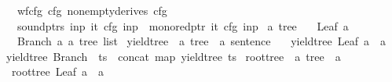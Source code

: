 \begin{isabellebody}
\ \ \ {\isachardoublequoteopen}wf{\isacharunderscore}{\kern0pt}cfg\ cfg{\isachardoublequoteclose}\ {\isachardoublequoteopen}nonempty{\isacharunderscore}{\kern0pt}derives\ cfg{\isachardoublequoteclose}\isanewline
\ \ \ {\isachardoublequoteopen}sound{\isacharunderscore}{\kern0pt}ptrs\ inp\ {\isacharparenleft}{\kern0pt}{\isasymII}{\isacharunderscore}{\kern0pt}it\ cfg\ inp{\isacharparenright}{\kern0pt}\ {\isasymand}\ mono{\isacharunderscore}{\kern0pt}red{\isacharunderscore}{\kern0pt}ptr\ {\isacharparenleft}{\kern0pt}{\isasymII}{\isacharunderscore}{\kern0pt}it\ cfg\ inp{\isacharparenright}{\kern0pt}{\isachardoublequoteclose}%
\isadelimproof
%
\endisadelimproof
%
\isatagproof
%
\endisatagproof
{\isafoldproof}%
%
\isadelimproof
%
\endisadelimproof
%
\isadelimdocument
%
\endisadelimdocument
%
\isatagdocument
%
\isamarkuptrue%
%
\endisatagdocument
{\isafolddocument}%
%
\isadelimdocument
%
\endisadelimdocument
{}\isamarkupfalse%
\ {\isacharprime}{\kern0pt}a\ tree\ {\isacharequal}{\kern0pt}\isanewline
\ \ Leaf\ {\isacharprime}{\kern0pt}a\isanewline
\ \ {\isacharbar}{\kern0pt}\ Branch\ {\isacharprime}{\kern0pt}a\ {\isachardoublequoteopen}{\isacharprime}{\kern0pt}a\ tree\ list{\isachardoublequoteclose}\isanewline
\isanewline
{}\isamarkupfalse%
\ yield{\isacharunderscore}{\kern0pt}tree\ {\isacharcolon}{\kern0pt}{\isacharcolon}{\kern0pt}\ {\isachardoublequoteopen}{\isacharprime}{\kern0pt}a\ tree\ {\isasymRightarrow}\ {\isacharprime}{\kern0pt}a\ sentence{\isachardoublequoteclose}\ \isanewline
\ \ {\isachardoublequoteopen}yield{\isacharunderscore}{\kern0pt}tree\ {\isacharparenleft}{\kern0pt}Leaf\ a{\isacharparenright}{\kern0pt}\ {\isacharequal}{\kern0pt}\ {\isacharbrackleft}{\kern0pt}a{\isacharbrackright}{\kern0pt}{\isachardoublequoteclose}\isanewline
{\isacharbar}{\kern0pt}\ {\isachardoublequoteopen}yield{\isacharunderscore}{\kern0pt}tree\ {\isacharparenleft}{\kern0pt}Branch\ {\isacharunderscore}{\kern0pt}\ ts{\isacharparenright}{\kern0pt}\ {\isacharequal}{\kern0pt}\ concat\ {\isacharparenleft}{\kern0pt}map\ yield{\isacharunderscore}{\kern0pt}tree\ ts{\isacharparenright}{\kern0pt}{\isachardoublequoteclose}\isanewline
\isanewline
{}\isamarkupfalse%
\ root{\isacharunderscore}{\kern0pt}tree\ {\isacharcolon}{\kern0pt}{\isacharcolon}{\kern0pt}\ {\isachardoublequoteopen}{\isacharprime}{\kern0pt}a\ tree\ {\isasymRightarrow}\ {\isacharprime}{\kern0pt}a{\isachardoublequoteclose}\ \isanewline
\ \ {\isachardoublequoteopen}root{\isacharunderscore}{\kern0pt}tree\ {\isacharparenleft}{\kern0pt}Leaf\ a{\isacharparenright}{\kern0pt}\ {\isacharequal}{\kern0pt}\ a{\isachardoublequoteclose}\isanewline

\end{isabellebody}

